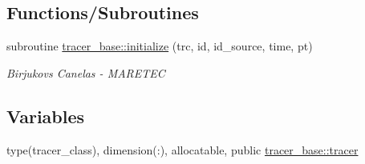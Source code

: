 \subsection*{Functions/\+Subroutines}
\begin{DoxyCompactItemize}
\item 
subroutine \mbox{\hyperlink{namespacetracer__base_ad712d20080a9daa44024d61afae670a4}{tracer\+\_\+base\+::initialize}} (trc, id, id\+\_\+source, time, pt)
\begin{DoxyCompactList}\small\item\em Birjukovs Canelas -\/ M\+A\+R\+E\+T\+EC \end{DoxyCompactList}\end{DoxyCompactItemize}
\subsection*{Variables}
\begin{DoxyCompactItemize}
\item 
type(tracer\+\_\+class), dimension(\+:), allocatable, public \mbox{\hyperlink{namespacetracer__base_a7f839546575f08e3b944dafdf5e0b2d2}{tracer\+\_\+base\+::tracer}}
\end{DoxyCompactItemize}
